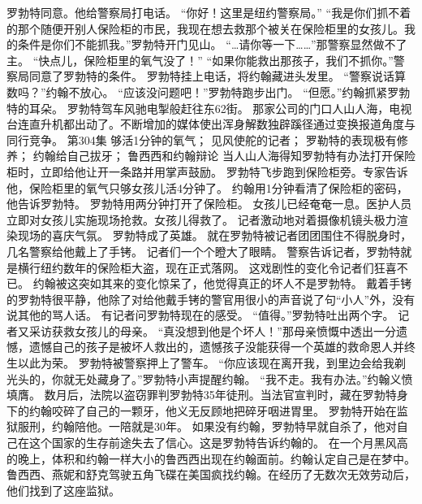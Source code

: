 \documentclass[a4paper,12pt,UTF8,twoside]{ctexbook}
\begin{document}
        罗勃特同意。他给警察局打电话。  
        “你好！这里是纽约警察局。”  
        “我是你们抓不着的那个随便开别人保险柜的市民，我现在想去救那个被关在保险柜里的女孩儿。我的条件是你们不能抓我。”罗勃特开门见山。  
        “…请你等一下……”那警察显然做不了主。  
        “快点儿，保险柜里的氧气没了！”  
        “如果你能救出那孩子，我们不抓你。”警察局同意了罗勃特的条件。  
        罗勃特挂上电话，将约翰藏进头发里。  
        “警察说话算数吗？”约翰不放心。  
        “应该没问题吧！”罗勃特跑步出门。  
        “但愿。”约翰抓紧罗勃特的耳朵。  
        罗勃特驾车风驰电掣般赶往东62街。  
        那家公司的门口人山人海，电视台连直升机都出动了。不断增加的媒体使出浑身解数独辟蹊径通过变换报道角度与同行竞争。          第304集  
        够活1分钟的氧气；  
        见风使舵的记者；  
        罗勒特的表现极有修养；  
        约翰给自己拔牙；  
        鲁西西和约翰辩论    
        当人山人海得知罗勃特有办法打开保险柜时，立即给他让开一条路并用掌声鼓励。  
        罗勃特飞步跑到保险柜旁。专家告诉他，保险柜里的氧气只够女孩儿活4分钟了。  
        约翰用1分钟看清了保险柜的密码，他告诉罗勃特。  
        罗勃特用两分钟打开了保险柜。  
        女孩儿已经奄奄一息。医护人员立即对女孩儿实施现场抢救。女孩儿得救了。  
        记者激动地对着摄像机镜头极力渲染现场的喜庆气氛。  
        罗勃特成了英雄。  
        就在罗勃特被记者团团围住不得脱身时，几名警察给他戴上了手铐。  
        记者们一个个瞪大了眼睛。  
        警察告诉记者，罗勃特就是横行纽约数年的保险柜大盗，现在正式落网。  
        这戏剧性的变化令记者们狂喜不已。  
        约翰被这突如其来的变化惊呆了，他觉得真正的坏人不是罗勃特。  
        戴着手铐的罗勃特很平静，他除了对给他戴手铐的警官用很小的声音说了句“小人”外，没有说其他的骂人话。  
        有记者问罗勃特现在的感受。  
        “值得。”罗勃特吐出两个字。  
        记者又采访获救女孩儿的母亲。  
        “真没想到他是个坏人！”那母亲愤慨中透出一分遗憾，遗憾自己的孩子是被坏人救出的，遗憾孩子没能获得一个英雄的救命恩人并终生以此为荣。  
        罗勃特被警察押上了警车。  
        “你应该现在离开我，到里边会给我剃光头的，你就无处藏身了。”罗勃特小声提醒约翰。  
        “我不走。我有办法。”约翰义愤填膺。  
        数月后，法院以盗窃罪判罗勃特35年徒刑。当法官宣判时，藏在罗勃特身下的约翰咬碎了自己的一颗牙，他义无反顾地把碎牙咽进胃里。  
        罗勃特开始在监狱服刑，约翰陪他。一陪就是30年。  
        如果没有约翰，罗勃特早就自杀了，他对自己在这个国家的生存前途失去了信心。这是罗勃特告诉约翰的。  
        在一个月黑风高的晚上，体积和约翰一样大小的鲁西西出现在约翰面前。约翰认定自己是在梦中。  
        鲁西西、燕妮和舒克驾驶五角飞碟在美国疯找约翰。在经历了无数次无效劳动后，他们找到了这座监狱。  
\end{document}

